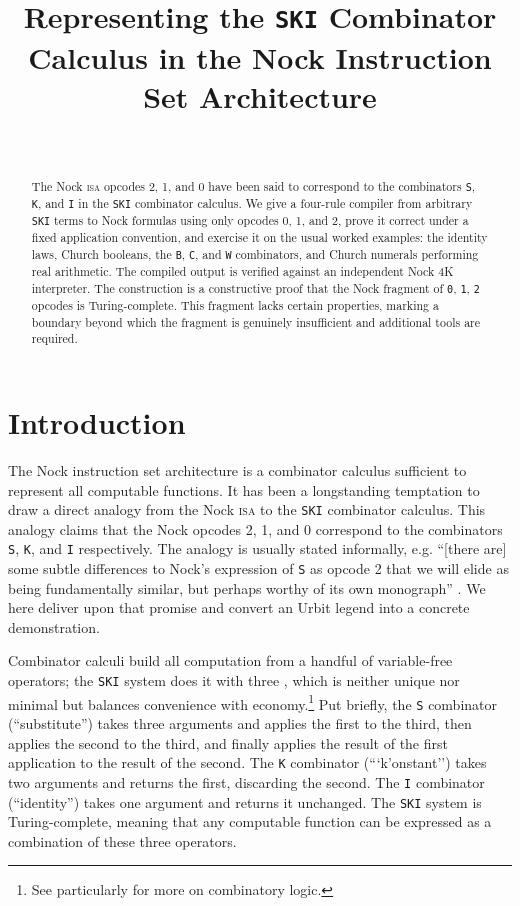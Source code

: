 \documentclass[twoside]{article}
\title{Representing the \texttt{SKI} Combinator Calculus in the Nock Instruction Set Architecture}
\author{\authorname~\authorpatp \\ \affiliation}
\date{}
\begin{document}
\maketitle
\thispagestyle{firststyle}

\begin{abstract}
The Nock \textsc{isa} opcodes 2, 1, and 0 have been said to correspond to the combinators \texttt{S}, \texttt{K}, and \texttt{I} in the \texttt{SKI} combinator calculus.  We give a four-rule compiler from arbitrary \texttt{SKI} terms to Nock formulas using only opcodes 0, 1, and 2, prove it correct under a fixed application convention, and exercise it on the usual worked examples: the identity laws, Church booleans, the \texttt{B}, \texttt{C}, and \texttt{W} combinators, and Church numerals performing real arithmetic.  The compiled output is verified against an independent Nock 4K interpreter.  The construction is a constructive proof that the Nock fragment of \texttt{0}, \texttt{1}, \texttt{2} opcodes is Turing-complete.  This fragment lacks certain properties, marking a boundary beyond which the fragment is genuinely insufficient and additional tools are required.
\end{abstract}

\setcounter{page}{1}

\tableofcontents

\section{Introduction}

The Nock instruction set architecture is a combinator calculus sufficient to represent all computable functions.  It has been a longstanding temptation to draw a direct analogy from the Nock \textsc{isa} to the \texttt{SKI} combinator calculus.  This analogy claims that the Nock opcodes 2, 1, and 0 correspond to the combinators \texttt{S}, \texttt{K}, and \texttt{I} respectively.  The analogy is usually stated informally, e.g. ``[there are] some subtle differences to Nock's expression of \texttt{S} as opcode 2 that we will elide as being fundamentally similar, but perhaps worthy of its own monograph'' \citep{lagrev2025}.  We here deliver upon that promise and convert an Urbit legend into a concrete demonstration.

Combinator calculi build all computation from a handful of variable-free operators; the \texttt{SKI} system does it with three \citep{Curry1958}, which is neither unique nor minimal but balances convenience with economy.\footnote{See particularly \citet{Smullyan1985} for more on combinatory logic.}  Put briefly, the \texttt{S} combinator (``substitute'') takes three arguments and applies the first to the third, then applies the second to the third, and finally applies the result of the first application to the result of the second.  The \texttt{K} combinator (```k'onstant'') takes two arguments and returns the first, discarding the second.  The \texttt{I} combinator (``identity'') takes one argument and returns it unchanged.  The \texttt{SKI} system is Turing-complete, meaning that any computable function can be expressed as a combination of these three operators.
\end{document}
